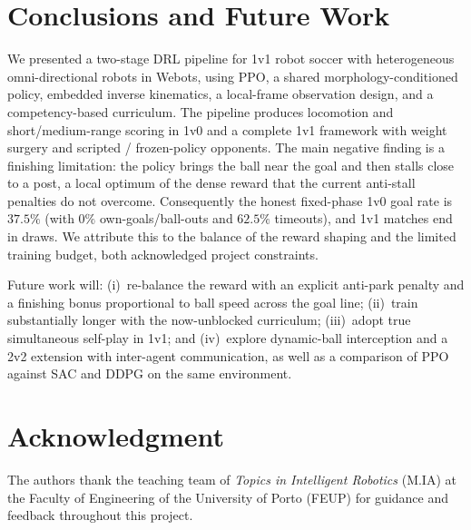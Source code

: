 \documentclass[conference]{IEEEtran}
\begin{document}
\section{Conclusions and Future Work} \label{sec:conclusion}
We presented a two-stage DRL pipeline for 1v1 robot soccer with heterogeneous
omni-directional robots in Webots, using PPO, a shared morphology-conditioned
policy, embedded inverse kinematics, a local-frame observation design, and a
competency-based curriculum. The pipeline produces locomotion and short/medium-range
scoring in 1v0 and a complete 1v1 framework with weight surgery and scripted /
frozen-policy opponents. The main negative finding is a finishing limitation: the
policy brings the ball near the goal and then stalls close to a post, a local
optimum of the dense reward that the current anti-stall penalties do not overcome.
Consequently the honest fixed-phase 1v0 goal rate is $37.5\%$ (with $0\%$
own-goals/ball-outs and $62.5\%$ timeouts), and 1v1 matches end in draws. We
attribute this to the balance of the reward shaping and the limited training
budget, both acknowledged project constraints.

Future work will: (i)~re-balance the reward with an explicit anti-park penalty and
a finishing bonus proportional to ball speed across the goal line; (ii)~train
substantially longer with the now-unblocked curriculum; (iii)~adopt true
simultaneous self-play in 1v1; and (iv)~explore dynamic-ball interception and a 2v2
extension with inter-agent communication, as well as a comparison of PPO against
SAC and DDPG on the same environment.

\section*{Acknowledgment}
The authors thank the teaching team of \emph{Topics in Intelligent Robotics}
(M.IA) at the Faculty of Engineering of the University of Porto (FEUP) for guidance
and feedback throughout this project.



\end{document}

